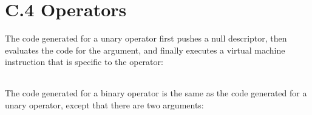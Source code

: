 \section[C.4 Operators]{C.4 Operators}

The code generated for a unary operator first pushes a null
descriptor, then evaluates the code for the argument, and finally
executes a virtual machine instruction that is specific to the
operator:

\begin{flushleft}
\tabletail{}
\tablelasttail{}
\begin{supertabular}{|m{1.9066598in}|m{2.75596in}|}

\end{supertabular}
\end{flushleft}

The code generated for a binary operator is the same as the code
generated for a unary operator, except that there are two arguments:

\begin{flushleft}
\tabletail{}
\tablelasttail{}
\begin{supertabular}{|m{1.9066598in}|m{2.75596in}|}

\end{supertabular}
\end{flushleft}

